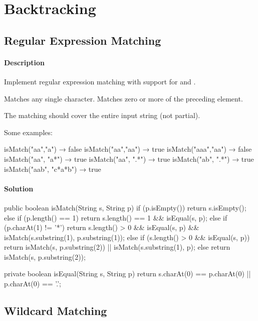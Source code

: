 \chapter{Backtracking}

\section{Regular Expression Matching} %

\subsubsection{Description}
Implement regular expression matching with support for  and .

 Matches any single character.
 Matches zero or more of the preceding element.

The matching should cover the entire input string (not partial).

Some examples:
\begin{Code}
isMatch("aa","a") → false
isMatch("aa","aa") → true
isMatch("aaa","aa") → false
isMatch("aa", "a*") → true
isMatch("aa", ".*") → true
isMatch("ab", ".*") → true
isMatch("aab", "c*a*b") → true
\end{Code}

\subsubsection{Solution}

\begin{Code}
public boolean isMatch(String s, String p) {
    if (p.isEmpty()) {
        return s.isEmpty();
    } else if (p.length() == 1) {
        return s.length() == 1 && isEqual(s, p);
    } else if (p.charAt(1) != '*') {
        return s.length() > 0 && isEqual(s, p) && isMatch(s.substring(1), p.substring(1));
    } else {
        if (s.length() > 0 && isEqual(s, p)) {
            return isMatch(s, p.substring(2)) || isMatch(s.substring(1), p);
        } else {
            return isMatch(s, p.substring(2));
        }
    }
}

private boolean isEqual(String s, String p) {
    return s.charAt(0) == p.charAt(0) || p.charAt(0) == '.';
}
\end{Code}

\newpage

\section{Wildcard Matching}

